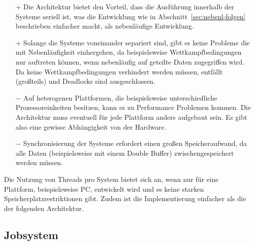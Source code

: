 \begin{itemize}
	\item[$+$] Die Architektur bietet den Vorteil, dass die Ausführung innerhalb der Systeme seriell ist, was die Entwicklung wie in Abschnitt~\ref{sec:nebenl-folgen} beschrieben einfacher macht, als nebenläufige Entwicklung.
	\item[$+$] Solange die Systeme voneinander separiert sind, gibt es keine Probleme die mit Nebenläufigkeit einhergehen, da beispielsweise Wettkampfbedingungen nur auftreten können, wenn nebenläufig auf geteilte Daten zugegriffen wird. Da keine Wettkampfbedingungen verhindert werden müssen, entfällt (großteils) und Deadlocks sind ausgeschlossen.
	\item[$-$] Auf heterogenen Plattformen, die beispielsweise unterschiedliche Prozessoreinheiten besitzen, kann es zu Performance Problemen kommen. Die Architektur muss eventuell für jede Plattform anders aufgebaut sein. Es gibt also eine gewisse Abhängigkeit von der Hardware.
	\item[$-$] Synchronisierung der Systeme erfordert einen großen Speicheraufwand, da alle Daten (beispielsweise mit einem Double Buffer) zwischengespeichert werden müssen.
\end{itemize}

Die Nutzung von Threads pro System bietet sich an, wenn nur für eine Plattform, beispielsweise PC, entwickelt wird und es keine starken Speicherplatzrestriktionen gibt. Zudem ist die Implementierung einfacher als die der folgenden Architektur.

\subsection{Jobsystem}\label{sec:gamesJobsystem}

